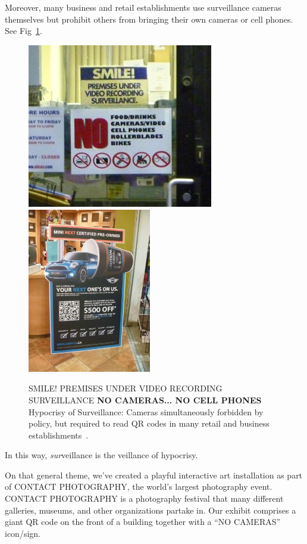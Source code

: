 Moreover, many business and retail establishments use
surveillance cameras themselves but prohibit others from
bringing their own cameras or cell phones.  See Fig~\ref{surveillancehypocrisy}.
\begin{figure}
  \centering
  \includegraphics[height=2.83in]{ch5/figs/signoalicosproc2lowq.jpg}
  \includegraphics[height=2.83in]{ch5/figs/advertisementQR_lowres.jpg}
    \caption{SMILE! 
             PREMISES UNDER VIDEO RECORDING SURVEILLANCE
             {\bf NO CAMERAS... NO CELL PHONES}
             Hypocrisy of Surveillance: Cameras simultaneously forbidden
             by policy, but
             required to read QR codes in many retail and business
             establishments~\cite{lo2013augmediated}.
            }
    \label{surveillancehypocrisy}
\end{figure}
In this way, {\em sur}veillance is the veillance of hypocrisy.

On that general theme, we've created a playful interactive art installation
as part of CONTACT PHOTOGRAPHY, the world's largest photography event.
CONTACT PHOTOGRAPHY is a photography festival that many different galleries,
museums, and other organizations partake in.
Our exhibit comprises a giant QR code on the front of a building
together with a ``NO CAMERAS'' icon/sign.

